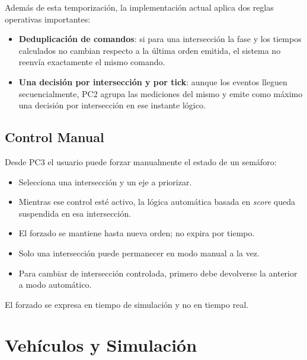 \documentclass[12pt, a4paper]{article}
\let\oldtexttt\texttt
\renewcommand{\texttt}[1]{\oldtexttt{\seqsplit{#1}}}
\begin{document}
Además de esta temporización, la implementación actual aplica dos reglas operativas importantes:

\begin{itemize}
    \item \textbf{Deduplicación de comandos}: si para una intersección la fase y los tiempos calculados no cambian respecto a la última orden emitida, el sistema no reenvía exactamente el mismo comando.
    \item \textbf{Una decisión por intersección y por tick}: aunque los eventos lleguen secuencialmente, PC2 agrupa las mediciones del mismo \texttt{tick\_origen} y emite como máximo una decisión por intersección en ese instante lógico.
\end{itemize}

\subsection{Control Manual}

Desde PC3 el usuario puede forzar manualmente el estado de un semáforo:

\begin{itemize}
    \item Selecciona una intersección y un eje a priorizar.
    \item Mientras ese control esté activo, la lógica automática basada en \textit{score} queda suspendida en esa intersección.
    \item El forzado se mantiene hasta nueva orden; no expira por tiempo.
    \item Solo una intersección puede permanecer en modo manual a la vez.
    \item Para cambiar de intersección controlada, primero debe devolverse la anterior a modo automático.
\end{itemize}

El forzado se expresa en tiempo de simulación y no en tiempo real.

\section{Vehículos y Simulación}

\end{document}
